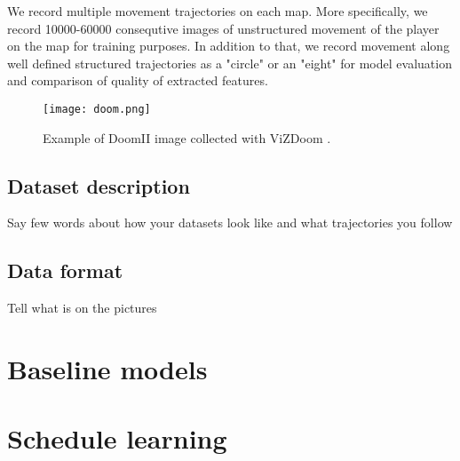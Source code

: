 We record multiple movement trajectories on each map.
More specifically, we record 10000-60000 consequtive images of unstructured movement of the player on the map for training purposes.
In addition to that, we record movement along well defined structured trajectories as a "circle" or an "eight" for model evaluation and comparison of quality of extracted features.


\begin{figure}
\centering
\texttt{[image: doom.png]} %
\caption{Example of DoomII image collected with ViZDoom \cite{Kempka2016}.}
\label{fig:doom}
\end{figure}

\subsection{Dataset description}

Say few words about how your datasets look like and what trajectories you follow

\subsection{Data format}

Tell what is on the pictures



\section{Baseline models}
\section{Schedule learning}
